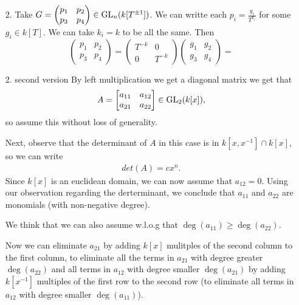 \begin{exercise}{2}
\begin{enumerate}
    \item[2.]{
            Take $G = \begin{pmatrix} p_1 & p_2 \\ p_3 & p_4 \end{pmatrix} \in
                \operatorname{GL}_n(k[T^{\pm 1}])$. We can writte each $p_i =
                \frac{g_i}{T^{k_i}}$ for some $g_i \in k[T]$. We can take $k_i =
                k$ to be all the same. Then
                \begin{equation}
                    \begin{pmatrix} p_1 & p_2 \\ p_3 & p_4 \end{pmatrix} =
                        \begin{pmatrix} T^{-k} & 0 \\ 0 & T^{-k} \end{pmatrix} 
                    \begin{pmatrix} g_1 & g_2 \\ g_3 & g_4 \end{pmatrix} = 
                \end{equation}
        }
    \item[2. second version]
    By left multiplication we get a diagonal matrix we get that 
    \begin{align*}
        A=\begin{bmatrix}
            a_{11}&a_{12}\\
            a_{21}&a_{22}
        \end{bmatrix}
        \in \operatorname{GL}_2(k[x]),
    \end{align*}
    so assume this without loss of generality.

    Next, observe that the determinant of $A$ in this case is in $k[x,x^{-1}]\cap k[x]$, so we can write 
    \begin{align*}
        det(A)=cx^n.
    \end{align*}
    Since $k[x]$ is an euclidean domain, we can now assume that $a_{12}=0$. Using our observation regarding
    the derterminant, we conclude that $a_{11}$ and $a_{22}$ are monomials (with non-negative degree).

    We think that we can also assume w.l.o.g that $\deg(a_{11})\geq \deg(a_{22})$.


    Now we can eliminate $a_{21}$ by adding $k[x]$ mulitples of the second column to the first column, to 
    eliminate all the terms in $a_{21}$ with degree greater $\deg(a_{22})$ and all terms in
    $a_{12}$ with degree smaller $\deg(a_{21})$ by adding $k[x^{-1}]$ multiples of the first row 
    to the second row (to eliminate all terms in $a_{12}$ with degree smaller $\deg(a_{11})$).
    

\end{enumerate}
\end{exercise}
